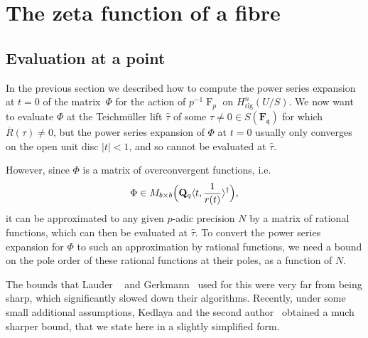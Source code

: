 \documentclass[a4paper,11pt]{article}
\numberwithin{equation}{section}
\newcommand{\QQ}{\mathbf{Q}} %
\newcommand{\FF}{\mathbf{F}} %
\DeclareMathOperator{\Frob}{F}           %
\providecommand{\Hrig}{H_{\text{rig}}}  %
\theoremstyle{definition}
\begin{document}

\section{The zeta function of a fibre}

\subsection{Evaluation at a point}
\label{sec:Evaluation}

In the previous section we described how to compute the power series expansion at $t=0$ of
the matrix~$\Phi$ for the action of $p^{-1} \Frob_p$ on $\Hrig^{n}(U/S)$. We now want to
evaluate $\Phi$ at the Teichm\"uller lift $\hat{\tau}$ of some $\tau \neq 0 \in S(\FF_{\mathfrak{q}})$
for which $\overline{R}(\tau) \neq 0$,
but the power series expansion of $\Phi$ at $t=0$ usually only converges on the open 
unit disc $|t|<1$, and so cannot be evaluated at $\hat{\tau}$. 

However, since $\Phi$ is a matrix of overconvergent functions, i.e.\ 
\[
\Phi \in M_{b \times b}\Bigl(\QQ_q \langle t,\frac{1}{r(t)} \rangle^{\dag}\Bigr),
\]
it can be approximated to any given $p$-adic precision $N$ by a matrix of rational 
functions, which can then be evaluated at $\hat{\tau}$. To convert the power series expansion
for $\Phi$ to such an approximation by rational functions, we need a bound on the pole order
of these rational functions at their poles, as a function of $N$. 

The bounds that
Lauder ~\citep[\S 8.1]{Lauder2004a} and Gerkmann~\citep[\S 6]{Gerkmann2007} used for this
were very far from being sharp, which significantly slowed down their algorithms.
Recently, under some small additional assumptions, Kedlaya and the second 
author~\citep[Theorem~2.1]{KedlayaTuitman2012} obtained a much sharper bound,
that we state here in a slightly simplified form.
\end{document}
